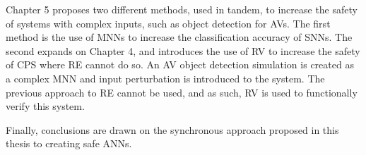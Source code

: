 Chapter 5 proposes two different methods, used in tandem, to increase the safety of systems with complex inputs, such as object detection for \acp{AV}.
The first method is the use of \acp{MNN} to increase the classification accuracy of \acp{SNN}.
The second expands on Chapter 4, and introduces the use of \ac{RV} to increase the safety of \ac{CPS} where \ac{RE} cannot do so.
An \ac{AV} object detection simulation is created as a complex \ac{MNN} and input perturbation is introduced to the system.
The previous approach to \ac{RE} cannot be used, and as such, \ac{RV} is used to functionally verify this system.

Finally, conclusions are drawn on the synchronous approach proposed in this thesis to creating safe \acp{ANN}.

